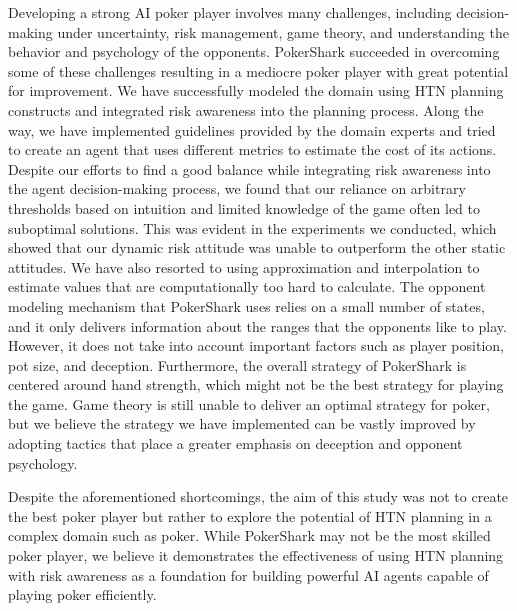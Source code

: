Developing a strong AI poker player involves many challenges, including decision-making under uncertainty, risk management, game theory, and understanding the behavior and psychology of the opponents. PokerShark succeeded in overcoming some of these challenges resulting in a mediocre poker player with great potential for improvement.
We have successfully modeled the domain using HTN planning constructs and integrated risk awareness into the planning process. Along the way, we have implemented guidelines provided by the domain experts and tried to create an agent that uses different metrics to estimate the cost of its actions. Despite our efforts to find a good balance while integrating risk awareness into the agent decision-making process, we found that our reliance on arbitrary thresholds based on intuition and limited knowledge of the game often led to suboptimal solutions. This was evident in the experiments we conducted, which showed that our dynamic risk attitude was unable to outperform the other static attitudes. We have also resorted to using approximation and interpolation to estimate values that are computationally too hard to calculate. The opponent modeling mechanism that PokerShark uses relies on a small number of states, and it only delivers information about the ranges that the opponents like to play. However, it does not take into account important factors such as player position, pot size, and deception. Furthermore, the overall strategy of PokerShark is centered around hand strength, which might not be the best strategy for playing the game. Game theory is still unable to deliver an optimal strategy for poker, but we believe the strategy we have implemented can be vastly improved by adopting tactics that place a greater emphasis on deception and opponent psychology.

Despite the aforementioned shortcomings, the aim of this study was not to create the best poker player but rather to explore the potential of HTN planning in a complex domain such as poker. While PokerShark may not be the most skilled poker player, we believe it demonstrates the effectiveness of using HTN planning with risk awareness as a foundation for building powerful AI agents capable of playing poker efficiently.